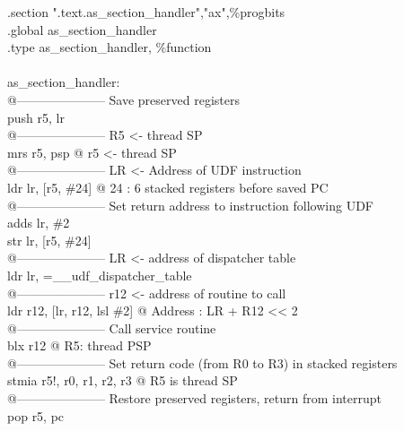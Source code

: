 \begin{SHELL}\small
\hspace*{1.2em}.section	".text.as\_section\_handler","ax",\%progbits\\
\hspace*{1.2em}.global as\_section\_handler\\
\hspace*{1.2em}.type as\_section\_handler, \%function\\
\\
as\_section\_handler:\\
@--------------------- Save preserved registers\\
\hspace*{1.2em}push  {r5, lr}\\
@--------------------- R5 <- thread SP\\
\hspace*{1.2em}mrs   r5, psp           @ r5 <- thread SP\\
@--------------------- LR <- Address of UDF instruction\\
\hspace*{1.2em}ldr   lr, [r5, \#24]     @ 24 : 6 stacked registers before saved PC\\
@--------------------- Set return address to instruction following UDF\\
\hspace*{1.2em}adds  lr, \#2\\
\hspace*{1.2em}str   lr, [r5, \#24]\\
@--------------------- LR <- address of dispatcher table\\
\hspace*{1.2em}ldr   lr, =\_\_udf\_dispatcher\_table\\
@--------------------- r12 <- address of routine to call\\
\hspace*{1.2em}ldr   r12, [lr, r12, lsl \#2]   @ Address : LR + R12 << 2\\
@--------------------- Call service routine\\
\hspace*{1.2em}blx   r12                      @ R5: thread PSP\\
@--------------------- Set return code (from R0 to R3) in stacked registers\\
\hspace*{1.2em}stmia r5!, {r0, r1, r2, r3}    @ R5 is thread SP\\
@--------------------- Restore preserved registers, return from interrupt\\
\hspace*{1.2em}pop   {r5, pc}
\end{SHELL}

